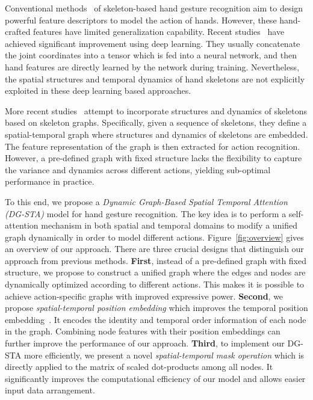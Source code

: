 \documentclass{bmvc2k}
\begin{document}
Conventional methods~\cite{ohn2013joint,de2016skeleton,de2017shrec} of skeleton-based hand gesture recognition aim to design powerful feature descriptors to model the action of hands. However, these hand-crafted features have limited generalization capability. Recent studies~\cite{hou2018spatial,chen2017motion,nunez2018convolutional} have achieved significant improvement using deep learning. They usually concatenate the joint coordinates into a tensor which is fed into a neural network, and then hand features are directly learned by the network during training. Nevertheless, the spatial structures and temporal dynamics of hand skeletons are not explicitly exploited in these deep learning based approaches.

More recent studies~\cite{yan2018spatial,si2018skeleton,zhao2019semantic} attempt to incorporate structures and dynamics of skeletons based on skeleton graphs. Specifically, given a sequence of skeletons, they define a spatial-temporal graph where structures and dynamics of skeletons are embedded. The feature representation of the graph is then extracted for action recognition. However, a pre-defined graph with fixed structure lacks the flexibility to capture the variance and dynamics across different actions, yielding sub-optimal performance in practice.  

To this end, we propose a \emph{Dynamic Graph-Based Spatial Temporal Attention (DG-STA)} model for hand gesture recognition. The key idea is to perform a self-attention mechanism in both spatial and temporal domains to modify a unified graph dynamically in order to model different actions.
Figure~\ref{fig:overview} gives an overview of our approach. There are three crucial designs that distinguish our approach from previous methods.
\textbf{First}, instead of a pre-defined graph with fixed structure, we propose to construct a unified graph where the edges and nodes are dynamically optimized according to different actions. This makes it is possible to achieve action-specific graphs with improved expressive power.
\textbf{Second}, we propose \emph{spatial-temporal position embedding} which improves the temporal position embedding~\cite{vaswani2017attention}. It encodes the identity and temporal order information of each node in the graph. Combining node features with their position embeddings can further improve the performance of our approach.
\textbf{Third}, to implement our DG-STA more efficiently, we present a novel \emph{spatial-temporal mask operation} which is directly applied to the matrix of scaled dot-products among all nodes. It significantly improves the computational efficiency of our model and allows easier input data arrangement.
\end{document}
